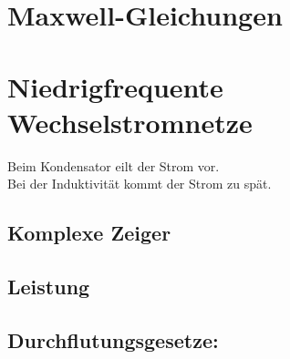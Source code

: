 \documentclass[german, fourcolumn, 6pt]{latex4ei/latex4ei_sheet}
\begin{document}
\titlespacing{\section}{0em}{1.0em}{0.1em}
\titlespacing{\subsection}{0em}{0.2em}{0.0em}
\titlespacing{\subsubsection}{0em}{0em}{0.0em}

\vspace{-4mm}

\section{Maxwell-Gleichungen}






\section{Niedrigfrequente Wechselstromnetze}
Beim Kondensator eilt der Strom vor.\\
Bei der Induktivität kommt der Strom zu spät.\\
\subsection{Komplexe Zeiger}

\subsection{Leistung}


\subsection{Durchflutungsgesetze:}
 \qquad
{}
\boxed { \div (\varepsilon  \nabla(\Phi)) = -\rho }
\end{document}
